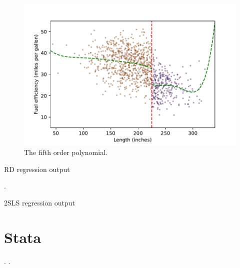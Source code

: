 \documentclass{article}
\begin{document}
\begin{figure}[h!]
    \centering
    \includegraphics{homework 7/output/figure/scatterplot5.pdf}
    \caption{The fifth order polynomial.}
    \label{fig:scatterplot5}
\end{figure}



\begin{table}[h]
    \centering
    
    \caption{RD regression output}
    \label{tab:RD}
\end{table}
\clearpage
{}. 
\begin{table}[h]
    \centering
    
    \caption{2SLS regression output}
    \label{tab:2SLSRD}
\end{table}

\section{Stata}

.
. 
\end{document}
